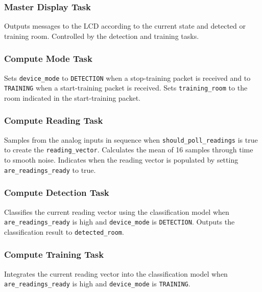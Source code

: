 \documentclass{article}
\begin{document}
\subsubsection{Master Display Task}


Outputs messages to the LCD according to the current state and detected
or training room.  Controlled by the detection and training tasks.

\subsubsection{Compute Mode Task}


Sets \verb#device_mode# to \verb#DETECTION# when a stop-training packet
is received and to \verb#TRAINING# when a start-training packet is
received.  Sets \verb#training_room# to the room indicated in the
start-training packet.

\subsubsection{Compute Reading Task}


Samples from the analog inputs in sequence when
\verb#should_poll_readings# is true to create the \verb#reading_vector#.
Calculates the mean of 16 samples through time to smooth noise.
Indicates when the reading vector is populated by setting
\verb#are_readings_ready# to true.

\subsubsection{Compute Detection Task}


Classifies the current reading vector using the classification model
when \verb#are_readings_ready# is high and \verb#device_mode# is
\verb#DETECTION#.  Outputs the classification result to
\verb#detected_room#.

\subsubsection{Compute Training Task}


Integrates the current reading vector into the classification model when
\verb#are_readings_ready# is high and \verb#device_mode# is
\verb#TRAINING#.
\end{document}
